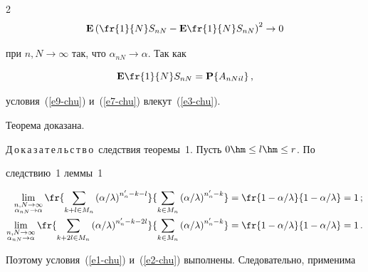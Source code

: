 \begin{multicols}{2}
\begin{equation}


\mathbf{E}\left(\fr{1}{N}S_{nN}-\mathbf{E}\fr{1}{N}S_{nN}\right)^2\to 0


\label{e9-chu}


\end{equation}


при $n, N\to\infty$ так, что $\alpha_{nN}\to\alpha$. Так как 


$$


\mathbf{E} \fr{1}{N}S_{nN}=\mathbf{P}\{A_{nNil}\}\,,


$$


условия~(\ref{e9-chu}) и~(\ref{e7-chu}) влекут~(\ref{e3-chu}). 


Теорема доказана.





\medskip





\noindent


Д\,о\,к\,а\,з\,а\,т\,е\,л\,ь\,с\,т\,в\,о\ следствия теоремы~1. Пусть $0\hm\le l\hm\le r$. По


следствию~1 леммы~1


\begin{align*}


\lim_{\substack{{n, N\to\infty}\\ {\alpha_{nN}\to\alpha}}}\fr{\sum\limits_{k+l\in


M_n}\left({\alpha}/{\lambda}\right)^{n'_n-k-l}}{\sum\limits_{k\in


M_n}\left({\alpha}/{\lambda}\right)^{n'_n-k}}&=


\fr{1-{\alpha}/{\lambda}}{1-{\alpha}/{\lambda}}=1\,;


\\


\lim_{\substack{{n, N\to\infty}\\ {\alpha_{nN}\to\alpha}}}\fr{\sum\limits_{k+2l\in


M_n}\left({\alpha}/{\lambda}\right)^{n'_n-k-2l}}{\sum\limits_{k\in


M_n}\left({\alpha}/{\lambda}\right)^{n'_n-k}}&=\fr{1-{\alpha}/{\lambda}}


{1-{\alpha}/{\lambda}}=1\,.


\end{align*}


Поэтому условия~(\ref{e1-chu}) и~(\ref{e2-chu}) выполнены. Следовательно, применима



\end{multicols}
